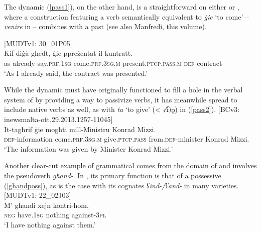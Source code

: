 \documentclass[output=paper]{langsci/langscibook}
\begin{document}
The dynamic  (\ref{pass1}), on the other hand, is a straightforward  on either  or , where a construction featuring a verb semantically equi\-valent to \textit{ġie} `to come' -- \textit{venire} in  -- combines with a past  (see also Manfredi, this volume).

\ea\label{pass1}
{[MUDTv1: 30\_01P05]} \\
\gll Kif diġà għedt, ġie ppreżentat il-kuntratt.\\
	as already say.\textsc{prf.1sg} come.\textsc{prf.3sg.m} present.\textsc{ptcp.pass.m} \textsc{def}-contract\\
	\glt `As I already said, the contract was presented.'\\
\z

While the dynamic  must have originally functioned to fill a hole in the verbal system of  by providing a way to passivize  verbs, it has meanwhile spread to include native verbs as well, as with \textit{ta} `to give' (< \textit{√ʕṭy}) in (\ref{pass2}).
\ea\label{pass2}
{[BCv3: inewsmalta-ott.29.2013.1257-11045]} \\
\gll It-tagħrif ġie mogħti mill-Ministru Konrad Mizzi.\\
	\textsc{def}-information come.\textsc{prf.3sg.m} give.\textsc{ptcp.pass} from.\textsc{def}-minister Konrad Mizzi.\\
	\glt `The information was given by Minister Konrad Mizzi.'\\
\z

Another clear-cut example of grammatical  comes from the domain of  and involves the pseudoverb \textit{għand-}. In , its primary function is that of a possessive (\ref{ghandposs}), as is the case with its cognates \textit{ʕind-/ʕand-} in many  varieties.
\ea\label{ghandposs}
{[MUDTv1: 22\_02J03]} \\
    \gll M' għandi xejn kontri-hom.\\
	\textsc{neg} have.\textsc{1sg} nothing against-\textsc{3pl}\\
	\glt `I have nothing against them.'\\
\z
\end{document}
